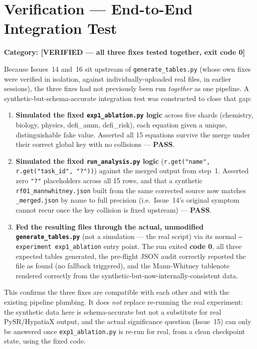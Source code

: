 \documentclass[11pt]{article}
\begin{document}
\section*{Verification --- End-to-End Integration Test}
\textbf{Category: [VERIFIED --- all three fixes tested together, exit code 0]}

Because Issues~14 and~16 sit upstream of \texttt{generate\_tables.py} (whose
own fixes were verified in isolation, against individually-uploaded real
files, in earlier sessions), the three fixes had not previously been run
\emph{together} as one pipeline. A synthetic-but-schema-accurate
integration test was constructed to close that gap:

\begin{enumerate}[leftmargin=1.5em]
  \item \textbf{Simulated the fixed \texttt{exp1\_ablation.py} logic} across
    five shards (chemistry, biology, physics, defi\_amm, defi\_risk), each
    equation given a unique, distinguishable fake value. Asserted all 15
    equations survive the merge under their correct global key with no
    collisions --- \textbf{PASS}.
  \item \textbf{Simulated the fixed \texttt{run\_analysis.py} logic}
    (\texttt{r.get("name", r.get("task\_id", "?"))}) against the merged
    output from step~1. Asserted zero \texttt{"?"} placeholders across all
    15 rows, and that a synthetic \texttt{rf01\_mannwhitney.json} built from
    the same corrected source now matches \texttt{\_merged.json} by name to
    full precision (i.e.\ Issue~14's original symptom cannot recur once the
    key collision is fixed upstream) --- \textbf{PASS}.
  \item \textbf{Fed the resulting files through the actual, unmodified
    \texttt{generate\_tables.py}} (not a simulation --- the real script) via
    its normal \texttt{--experiment exp1\_ablation} entry point. The run
    exited \textbf{code 0}, all three expected tables generated, the
    pre-flight JSON audit correctly reported the file as found (no
    fallback triggered), and the Mann-Whitney tablenote rendered correctly
    from the synthetic-but-now-internally-consistent data.
\end{enumerate}

This confirms the three fixes are compatible with each other and with the
existing pipeline plumbing. It does \emph{not} replace re-running the real
experiment: the synthetic data here is schema-accurate but not a
substitute for real PySR/HypatiaX output, and the actual significance
question (Issue~15) can only be answered once \texttt{exp1\_ablation.py} is
re-run for real, from a clean checkpoint state, using the fixed code.
\end{document}
